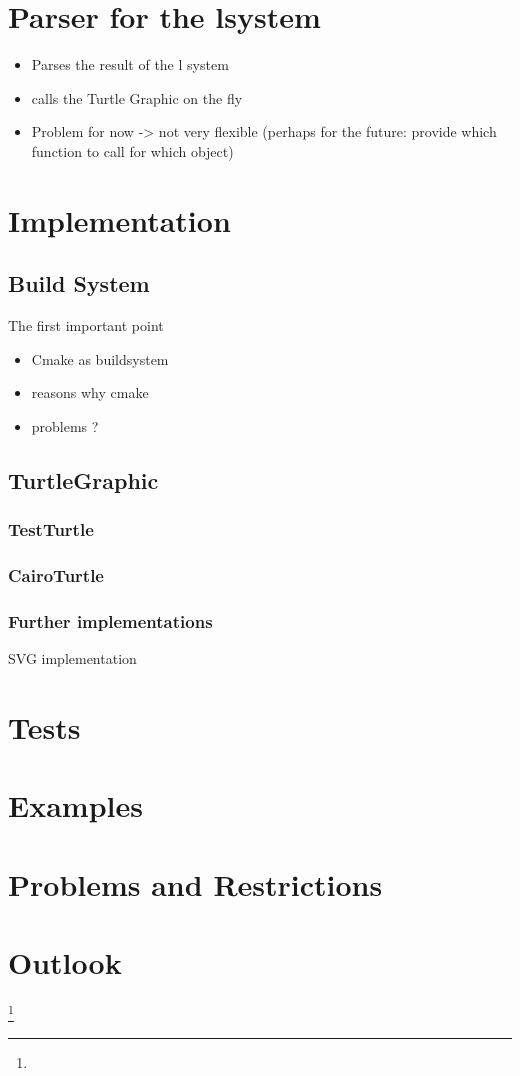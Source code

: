 \documentclass[english]{cpp-hmwk}
\begin{document}
\section{Parser for the lsystem}
\begin{itemize}
	\item Parses the result of the l system
	\item calls the Turtle Graphic on the fly
	
	\item Problem for now -> not very flexible (perhaps for the future: provide which function to call for which object)
\end{itemize}


\section{Implementation}
\subsection{Build System}
\label{section:buildsystem}
The first important point 

\begin{itemize}
	\item Cmake as buildsystem
	\item reasons why cmake
	\item problems ?
\end{itemize}


\subsection{TurtleGraphic}
\subsubsection{TestTurtle}
\subsubsection{CairoTurtle}
\subsubsection{Further implementations}
SVG implementation


\section{Tests}
\section{Examples}
\section{Problems and Restrictions}
\section{Outlook}
\footnote{}
\end{document}
